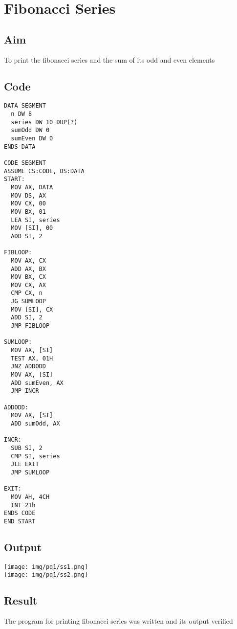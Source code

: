 \section{Fibonacci Series}
\subsection{Aim}
To print the fibonacci series and the sum of its odd and even elements

\subsection{Code}
\begin{lstlisting}
DATA SEGMENT
  n DW 8 
  series DW 10 DUP(?)
  sumOdd DW 0
  sumEven DW 0
ENDS DATA   

CODE SEGMENT
ASSUME CS:CODE, DS:DATA
START:
  MOV AX, DATA
  MOV DS, AX
  MOV CX, 00
  MOV BX, 01
  LEA SI, series
  MOV [SI], 00
  ADD SI, 2
  
FIBLOOP:
  MOV AX, CX
  ADD AX, BX
  MOV BX, CX
  MOV CX, AX
  CMP CX, n 
  JG SUMLOOP
  MOV [SI], CX
  ADD SI, 2
  JMP FIBLOOP 
  
SUMLOOP:
  MOV AX, [SI]
  TEST AX, 01H
  JNZ ADDODD
  MOV AX, [SI]
  ADD sumEven, AX
  JMP INCR

ADDODD:
  MOV AX, [SI]
  ADD sumOdd, AX

INCR:
  SUB SI, 2
  CMP SI, series
  JLE EXIT
  JMP SUMLOOP

EXIT:
  MOV AH, 4CH
  INT 21h
ENDS CODE
END START
\end{lstlisting}

\subsection{Output}
\begin{center}
	\texttt{[image: img/pq1/ss1.png]}\\
	\texttt{[image: img/pq1/ss2.png]}
\end{center} 

\subsection{Result}
The program for printing fibonacci series was written and its output verified